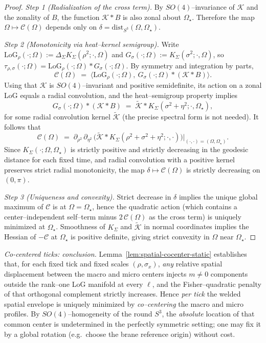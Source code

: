\documentclass[10pt]{article}
\theoremstyle{definition}
\theoremstyle{plain}
\begin{document}
\begin{proof}
\emph{Step 1 (Radialization of the cross term).}
By $SO(4)$--invariance of $\mathcal K$ and the zonality of $B$, the function $\mathcal K*B$ is also zonal about $\Omega_\star$.
Therefore the map $\Omega\mapsto \mathcal C(\Omega)$ depends only on $\delta=\mathrm{dist}_{S^3}(\Omega,\Omega_\star)$.

\smallskip
\emph{Step 2 (Monotonicity via heat--kernel semigroup).}
Write $\mathrm{LoG}_\rho(\cdot;\Omega):=\Delta_\Sigma K_\Sigma(\rho^2;\cdot,\Omega)$ and $G_\sigma(\cdot;\Omega):=K_\Sigma(\sigma^2;\cdot,\Omega)$,
so $\tau_{\rho,\sigma}(\cdot;\Omega)=\mathrm{LoG}_\rho(\cdot;\Omega)\ast G_\sigma(\cdot;\Omega)$. By symmetry and integration by parts,
\[
\mathcal C(\Omega)\;=\;\big\langle \mathrm{LoG}_\rho(\cdot;\Omega),\ G_\sigma(\cdot;\Omega)\ast(\mathcal K*B)\big\rangle.
\]
Using that $\mathcal K$ is $SO(4)$--invariant and positive semidefinite, its action on a zonal LoG equals a radial convolution, and
the heat--semigroup property implies
\[
G_\sigma(\cdot;\Omega)\ast (\mathcal K*B)\;=\;\widetilde{\mathcal K}\ast K_\Sigma(\sigma^2+\eta^2;\cdot,\Omega_\star),
\]
for some radial convolution kernel $\widetilde{\mathcal K}$ (the precise spectral form is not needed).
It follows that
\[
\mathcal C(\Omega)\;=\;\partial_{\rho^2}\,\partial_{\eta^2}\,\Big(\widetilde{\mathcal K}\ast K_\Sigma(\rho^2+\sigma^2+\eta^2;\cdot,\cdot)\Big)\Big|_{(\cdot,\cdot)=(\Omega,\Omega_\star)}.
\]
Since $K_\Sigma(\cdot;\Omega,\Omega_\star)$ is strictly positive and strictly decreasing in the geodesic distance for each fixed time,
and radial convolution with a positive kernel preserves strict radial monotonicity, the map
$\delta\mapsto \mathcal C(\Omega)$ is strictly decreasing on $(0,\pi)$.

\smallskip
\emph{Step 3 (Uniqueness and convexity).}
Strict decrease in $\delta$ implies the unique global maximum of $\mathcal C$ is at $\Omega=\Omega_\star$, hence the quadratic action
(which contains a center--independent self--term minus $2\,\mathcal C(\Omega)$ as the cross term) is uniquely minimized at $\Omega_\star$.
Smoothness of $K_\Sigma$ and $\widetilde{\mathcal K}$ in normal coordinates implies the Hessian of $-\mathcal C$ at $\Omega_\star$ is
positive definite, giving strict convexity in $\Omega$ near $\Omega_\star$.
\end{proof}

\noindent
\emph{Co-centered ticks: conclusion.}
Lemma~\ref{lem:spatial-cocenter-static} establishes that, for each fixed tick and fixed scales $(\rho,\sigma_x)$,
\emph{any} relative spatial displacement between the macro and micro centers injects $m\neq 0$ components
outside the rank–one LoG manifold at every $\ell$, and the Fisher–quadratic penalty of that orthogonal
complement strictly increases. Hence \emph{per tick} the welded spatial envelope is uniquely minimized by
\emph{co–centering} the macro and micro profiles. By $SO(4)$–homogeneity of the round $S^3$, the \emph{absolute}
location of that common center is undetermined in the perfectly symmetric setting; one may fix it by a global
rotation (e.g.\ choose the brane reference origin) without cost.
\end{document}
